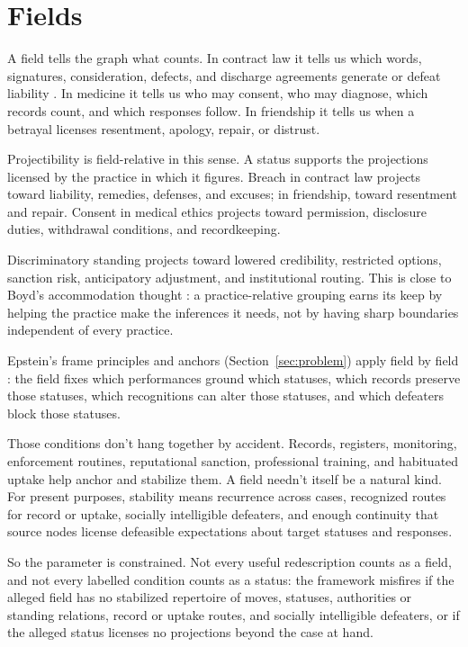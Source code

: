 \documentclass[12pt]{article}
\begin{document}
\section{Fields}
\label{sec:fields}

A field tells the graph what counts. In contract law it tells us which words, signatures, consideration, defects, and discharge agreements generate or defeat liability \citep[\S\S~281, 285]{americanLawInstitute1981RestatementContracts}. In medicine it tells us who may consent, who may diagnose, which records count, and which responses follow. In friendship it tells us when a betrayal licenses resentment, apology, repair, or distrust.

Projectibility is field-relative in this sense. A status supports the projections licensed by the practice in which it figures. Breach in contract law projects toward liability, remedies, defenses, and excuses; in friendship, toward resentment and repair. Consent in medical ethics projects toward permission, disclosure duties, withdrawal conditions, and recordkeeping.

Discriminatory standing projects toward lowered credibility, restricted options, sanction risk, anticipatory adjustment, and institutional routing. This is close to Boyd's accommodation thought \citep{boyd1999}: a practice-relative grouping earns its keep by helping the practice make the inferences it needs, not by having sharp boundaries independent of every practice.

Epstein's frame principles and anchors (Section~\ref{sec:problem}) apply field by field \citep{epstein2015AntTrap}: the field fixes which performances ground which statuses, which records preserve those statuses, which recognitions can alter those statuses, and which defeaters block those statuses.

Those conditions don't hang together by accident. Records, registers, monitoring, enforcement routines, reputational sanction, professional training, and habituated uptake help anchor and stabilize them. A field needn't itself be a natural kind. For present purposes, stability means recurrence across cases, recognized routes for record or uptake, socially intelligible defeaters, and enough continuity that source nodes license defeasible expectations about target statuses and responses.

So the parameter is constrained. Not every useful redescription counts as a field, and not every labelled condition counts as a status: the framework misfires if the alleged field has no stabilized repertoire of moves, statuses, authorities or standing relations, record or uptake routes, and socially intelligible defeaters, or if the alleged status licenses no projections beyond the case at hand.
\end{document}
